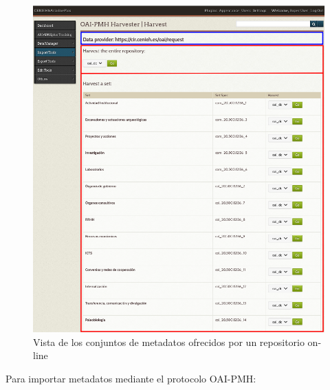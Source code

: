 \documentclass[
]{article}
\begin{document}
\begin{figure}
\hypertarget{oai-pmh-harvester-view-2}{%
\centering
\includegraphics{../_static/images/oai-pmh-harvester-view-2.png}
\caption{Vista de los conjuntos de metadatos ofrecidos por un
repositorio on-line}\label{oai-pmh-harvester-view-2}
}
\end{figure}

Para importar metadatos mediante el protocolo OAI-PMH:
\end{document}
